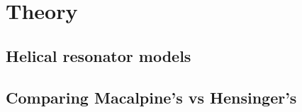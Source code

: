 \chapter{Theory}

\section{Helical resonator models}

\section{Comparing Macalpine's vs Hensinger's}